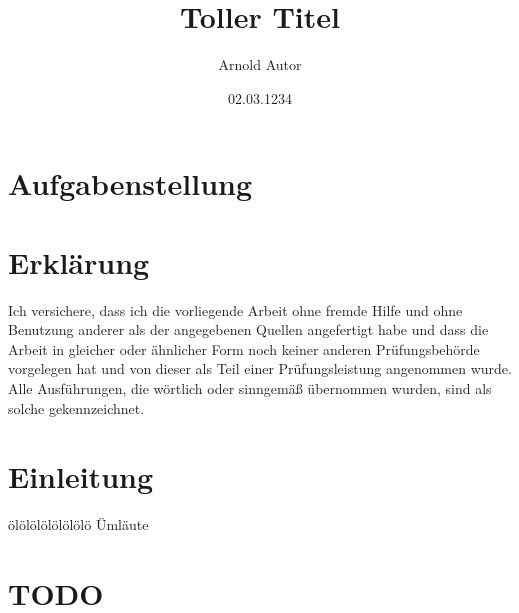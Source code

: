 \documentclass[draft]{max-masterarbeit} %
\title{Toller Titel}
\author{Arnold Autor}
\date{02.03.1234}
\begin{document}
\frontmatter
{} %

\titelseiteLRT
\pagestyle{empty}
\cleardoublepage
\chapter*{Aufgabenstellung}
\thispagestyle{empty}
\cleardoublepage
\chapter*{Erklärung}
\thispagestyle{empty}
Ich versichere, dass ich die vorliegende Arbeit ohne fremde Hilfe und ohne Benutzung anderer als
der angegebenen Quellen angefertigt habe und dass die Arbeit in gleicher oder ähnlicher Form noch
keiner anderen Prüfungsbehörde vorgelegen hat und von dieser als Teil einer Prüfungsleistung
angenommen wurde. Alle Ausführungen, die wörtlich oder sinngemäß übernommen wurden, sind als 
solche gekennzeichnet.

\vspace{4.5em}

\makeatletter
\let\thedate\@date
\let\theauthor\@author
\makeatother
\newcommand{\unterschriftsbreite}{.35\linewidth}
%

\cleardoublepage
{}
\pagestyle{scrheadings}
\tableofcontents



\mainmatter
\chapter{Einleitung}


ölölölölölölölö Ümläute



\chapter{TODO}
\end{document}

